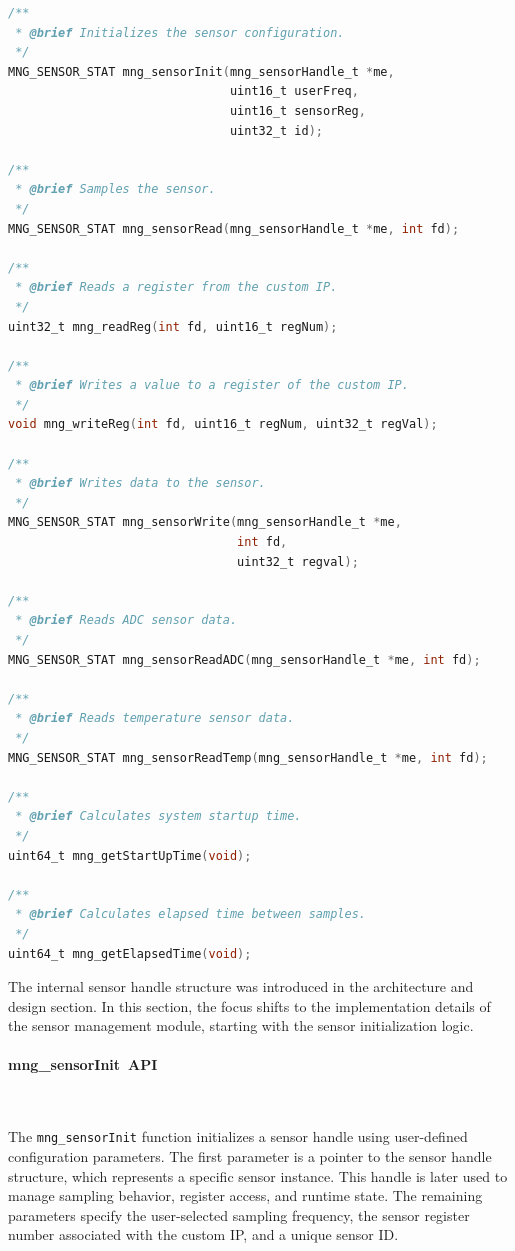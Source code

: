 \documentclass{article}
\begin{document}
\begin{lstlisting}[language=C,
caption={Sensor management module APIs},
label={lst:mng_sensor_api}]
/**
 * @brief Initializes the sensor configuration.
 */
MNG_SENSOR_STAT mng_sensorInit(mng_sensorHandle_t *me,
                               uint16_t userFreq,
                               uint16_t sensorReg,
                               uint32_t id);

/**
 * @brief Samples the sensor.
 */
MNG_SENSOR_STAT mng_sensorRead(mng_sensorHandle_t *me, int fd);

/**
 * @brief Reads a register from the custom IP.
 */
uint32_t mng_readReg(int fd, uint16_t regNum);

/**
 * @brief Writes a value to a register of the custom IP.
 */
void mng_writeReg(int fd, uint16_t regNum, uint32_t regVal);

/**
 * @brief Writes data to the sensor.
 */
MNG_SENSOR_STAT mng_sensorWrite(mng_sensorHandle_t *me,
                                int fd,
                                uint32_t regval);

/**
 * @brief Reads ADC sensor data.
 */
MNG_SENSOR_STAT mng_sensorReadADC(mng_sensorHandle_t *me, int fd);

/**
 * @brief Reads temperature sensor data.
 */
MNG_SENSOR_STAT mng_sensorReadTemp(mng_sensorHandle_t *me, int fd);

/**
 * @brief Calculates system startup time.
 */
uint64_t mng_getStartUpTime(void);

/**
 * @brief Calculates elapsed time between samples.
 */
uint64_t mng_getElapsedTime(void);
\end{lstlisting}

The internal sensor handle structure was introduced in the architecture and design 
section. In this section, the focus shifts to the implementation details of the sensor 
management module, starting with the sensor initialization logic.

\paragraph{mng\_sensorInit\ API}\

The \texttt{mng\_sensorInit} function initializes a sensor handle using user-defined 
configuration parameters. The first parameter is a pointer to the sensor handle structure, 
which represents a specific sensor instance. This handle is later used to manage sampling 
behavior, register access, and runtime state. The remaining parameters specify the 
user-selected sampling frequency, the sensor register number associated with the 
custom IP, and a unique sensor ID.
\end{document}
